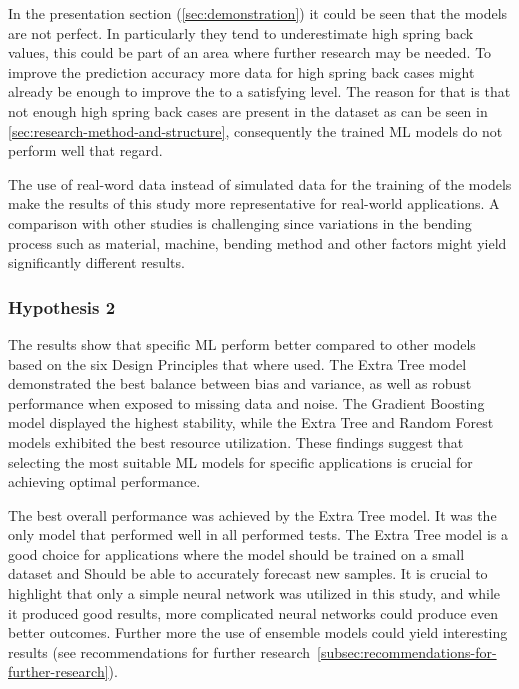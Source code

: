 In the presentation section (\cref{sec:demonstration}) it could be seen that the models are not perfect.
In particularly they tend to underestimate high spring back values, this could be part of an area where further research
may be needed.
To improve the prediction accuracy more data for high spring back cases might already be enough to improve the to a
satisfying level.
The reason for that is that not enough high spring back cases are present in the dataset as can be seen in
\cref{sec:research-method-and-structure}, consequently the trained ML models do not perform well that regard.

The use of real-word data instead of simulated data for the training of the models make the results of this study more
representative for real-world applications.
A comparison with other studies is challenging since variations in the bending process such as material, machine,
bending method and other factors might yield significantly different results.

\subsubsection{Hypothesis 2}

The results show that specific \ac{ML} perform better compared to other models based on the six Design Principles
that where used.
The Extra Tree model demonstrated the best balance between bias and variance, as well as robust performance when
exposed to missing data and noise.
The Gradient Boosting model displayed the highest stability, while the Extra Tree and Random Forest models exhibited
the best resource utilization.
These findings suggest that selecting the most suitable ML models for specific applications is crucial for achieving
optimal performance.

The best overall performance was achieved by the Extra Tree model.
It was the only model that performed well in all performed tests.
The Extra Tree model is a good choice for applications where the model should be trained on a small dataset and
Should be able to accurately forecast new samples.
It is crucial to highlight that only a simple neural network was utilized in this study, and while it produced good
results, more complicated neural networks could produce even better outcomes.
Further more the use of ensemble models could yield interesting results (see recommendations for further
research~\ref{subsec:recommendations-for-further-research}).

